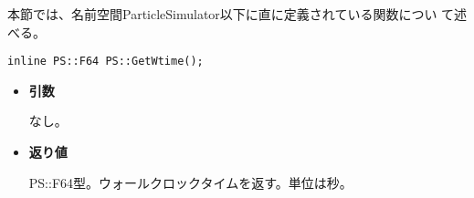 本節では、名前空間ParticleSimulator以下に直に定義されている関数につい
て述べる。



\begin{screen}
\begin{verbatim}
inline PS::F64 PS::GetWtime();
\end{verbatim}
\end{screen}

\begin{itemize}

\item{{\bf 引数}}

なし。

\item{{\bf 返り値}}

{PS::F64}型。ウォールクロックタイムを返す。単位は秒。

\end{itemize}



